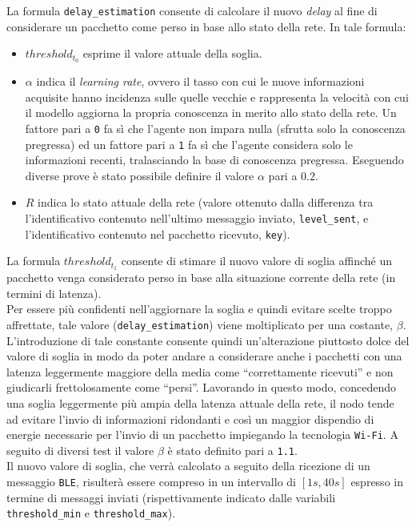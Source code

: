 \noindent La formula \texttt{delay\_estimation} consente di calcolare il nuovo \textit{delay} al fine di considerare un pacchetto come perso in base allo stato della rete. In tale formula: 
\begin{itemize}
    \item $threshold_{t_0}$ esprime il valore attuale della soglia.
    \item $\alpha$ indica il \textit{learning rate}, ovvero il tasso con cui le nuove informazioni acquisite hanno incidenza sulle quelle vecchie e rappresenta la velocità con cui il modello aggiorna la propria conoscenza in merito allo stato della rete. Un fattore pari a \texttt{0} fa sì che l'agente non impara nulla (sfrutta solo la conoscenza pregressa) ed un fattore pari a \texttt{1} fa sì che l'agente considera solo le informazioni recenti, tralasciando la base di conoscenza pregressa. Eseguendo diverse prove è stato possibile definire il valore $\alpha$ pari a $0.2$. 
    \item $R$ indica lo stato attuale della rete (valore ottenuto dalla differenza tra l'identificativo contenuto nell'ultimo messaggio inviato, \texttt{level\_sent}, e l'identificativo contenuto nel pacchetto ricevuto, \texttt{key}).
\end{itemize}
\noindent La formula \texttt{$threshold_{t_1}$} consente di stimare il nuovo valore di soglia affinché un pacchetto venga considerato perso in base alla situazione corrente della rete (in termini di latenza).\\
Per essere più confidenti nell'aggiornare la soglia e quindi evitare scelte troppo affrettate, tale valore (\texttt{delay\_estimation}) viene moltiplicato per una costante, \texttt{$\beta$}. L'introduzione di tale constante consente quindi un'alterazione piuttosto dolce del valore di soglia in modo da poter andare a considerare anche i pacchetti con una latenza leggermente maggiore della media come ``correttamente ricevuti'' e non giudicarli frettolosamente come ``persi''. Lavorando in questo modo, concedendo una soglia leggermente più ampia della latenza attuale della rete, il nodo tende ad evitare l'invio di informazioni ridondanti e così un maggior dispendio di energie necessarie per l'invio di un pacchetto impiegando la tecnologia \texttt{Wi-Fi}. A seguito di diversi test il valore $\beta$ è stato definito pari a \texttt{1.1}.\\

\noindent Il nuovo valore di soglia, che verrà calcolato a seguito della ricezione di un messaggio \texttt{BLE}, risulterà essere compreso in un intervallo di $[1s, 40s]$ espresso in termine di messaggi inviati (rispettivamente indicato dalle variabili \texttt{threshold\_min} e \texttt{threshold\_max}).\\

